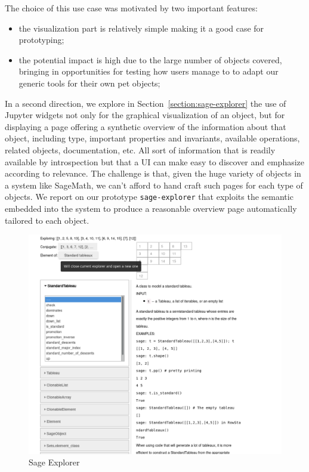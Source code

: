 \documentclass{deliverablereport}
\begin{document}
The choice of this use case was motivated by two important features:
\begin{itemize}
\item the visualization part is relatively simple making it a good
  case for prototyping;
\item the potential impact is high due to the large number of objects
  covered, bringing in opportunities for testing how users manage to
  to adapt our generic tools for their own pet objects;
\end{itemize}

In a second direction, we explore in
Section~\ref{section:sage-explorer} the use of Jupyter widgets not only
for the graphical visualization of an object, but for displaying a
page offering a synthetic overview of the information about that
object, including type, important properties and invariants, available
operations, related objects, documentation, etc. All sort of
information that is readily available by introspection but that a UI
can make easy to discover and emphasize according to relevance. The
challenge is that, given the huge variety of objects in a system like
SageMath, we can't afford to hand craft such pages for each type of
objects. We report on our prototype
\lstinline{sage-explorer} that exploits the semantic embedded into the
system to produce a reasonable overview page automatically tailored to
each object.


\begin{figure}[h]
  \begin{center}
    \includegraphics[width=\textwidth]{images/TableauExplorer}
  \end{center}
  \caption{Sage Explorer}
  \label{fig:tableau-explorer}
\end{figure}
\end{document}
